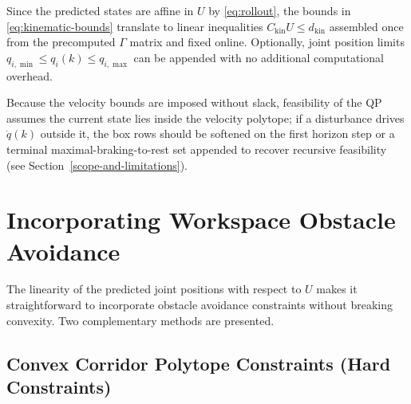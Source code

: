 Since the predicted states are affine in \(U\) by \eqref{eq:rollout},
the bounds in \eqref{eq:kinematic-bounds} translate to linear inequalities
\(C_{\text{kin}} U \leq d_{\text{kin}}\) assembled once from the
precomputed \(\Gamma\) matrix and fixed online. Optionally, joint
position limits \(q_{i,\min} \leq q_i(k) \leq q_{i,\max}\) can be
appended with no additional computational overhead.

Because the velocity bounds are imposed without slack, feasibility of the
QP assumes the current state lies inside the velocity polytope; if a
disturbance drives \(\dot q(k)\) outside it, the box rows should be
softened on the first horizon step or a terminal maximal-braking-to-rest
set appended to recover recursive feasibility (see
Section~\ref{scope-and-limitations}).

\section{Incorporating Workspace Obstacle
Avoidance}\label{iv.-incorporating-workspace-obstacle-avoidance}

The linearity of the predicted joint positions with respect to \(U\)
makes it straightforward to incorporate obstacle avoidance constraints
without breaking convexity. Two complementary methods are presented.

\subsection{Convex Corridor Polytope Constraints (Hard
Constraints)}\label{a.-convex-corridor-polytope-constraints-hard-constraints}

